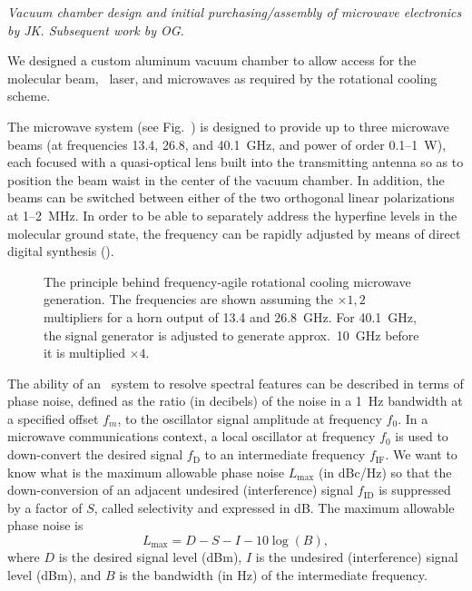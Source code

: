 \textit{Vacuum chamber design and initial purchasing/assembly of microwave
electronics by JK. Subsequent work by OG.}

We designed a custom aluminum vacuum chamber to allow access for the molecular
beam, \UV\ laser, and microwaves as required by the rotational cooling scheme.

The microwave system (see Fig.~) is designed to provide up to three
microwave beams (at frequencies 13.4, 26.8, and 40.1~GHz, and power of order
0.1--1~W), each focused with a quasi-optical lens built into the transmitting
antenna so as to position the beam waist in the center of the vacuum chamber. In
addition, the beams can be switched between either of the two orthogonal linear
polarizations at 1--2~MHz. In order to be able to separately address the
hyperfine levels in the molecular ground state, the frequency can be rapidly
adjusted by means of direct digital synthesis (\DDS).

\begin{figure}
    \makebox[\columnwidth][c]{%
        \small
        
    }
    \caption[Frequency-agile microwave generation.]{The principle behind
    frequency-agile rotational cooling microwave generation. The frequencies are
    shown assuming the $\times1,2$ multipliers for a horn output of 13.4 and
    26.8~GHz. For 40.1~GHz, the signal generator is adjusted to generate
    approx.\ 10~GHz before it is multiplied $\times4$.}
    \label{micro}
\end{figure}

The ability of an \RF\ system to resolve spectral features can be described in
terms of phase noise, defined as the ratio (in decibels) of the noise in a 1~Hz
bandwidth at a specified offset $f_m$, to the oscillator signal amplitude at
frequency $f_0$. In a microwave communications context, a local oscillator at
frequency $f_0$ is used to down-convert the desired signal $f_\text{D}$ to an
intermediate frequency $f_\text{IF}$. We want to know what is the maximum
allowable phase noise $L_\text{max}$ (in dBc/Hz) so that the down-conversion of
an adjacent undesired (interference) signal $f_\text{ID}$ is suppressed by a
factor of $S$, called selectivity and expressed in dB. The maximum allowable
phase noise is \cite[eqn~13.50]{pozar2006microwave}
%
\[
    L_\text{max}=D-S-I-10\log(B),
\]
where $D$ is the desired signal level (dBm), $I$ is the undesired (interference)
signal level (dBm), and $B$ is the bandwidth (in Hz) of the intermediate
frequency.

